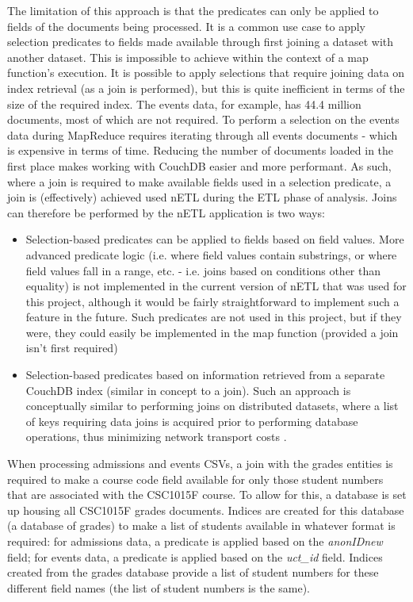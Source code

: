 The limitation of this approach is that the predicates can only be applied to fields of the documents being processed. It is a common use case to apply selection predicates to fields made available through first joining a dataset with another dataset. This is impossible to achieve within the context of a map function’s execution. It is possible to apply selections that require joining data on index retrieval (as a join is performed), but this is quite inefficient in terms of the size of the required index. The events data, for example, has 44.4 million documents, most of which are not required. To perform a selection on the events data during MapReduce requires iterating through all events documents - which is expensive in terms of time. Reducing the number of documents loaded in the first place makes working with CouchDB easier and more performant. As such, where a join is required to make available fields used in a selection predicate, a join is (effectively) achieved used nETL during the ETL phase of analysis. Joins can therefore be performed by the nETL application is two ways:

\begin{itemize}
    \item Selection-based predicates can be applied to fields based on field values. More advanced predicate logic (i.e. where field values contain substrings, or where field values fall in a range, etc. - i.e. joins based on conditions other than equality) is not implemented in the current version of nETL that was used for this project, although it would be fairly straightforward to implement such a feature in the future. Such predicates are not used in this project, but if they were, they could easily be implemented in the map function (provided a join isn't first required)
    \item Selection-based predicates based on information retrieved from a separate CouchDB index (similar in concept to a join). Such an approach is conceptually similar to performing joins on distributed datasets, where a list of keys requiring data joins is acquired prior to performing database operations, thus minimizing network transport costs \cite{sonia2018}.
\end{itemize}

When processing admissions and events CSVs, a join with the grades entities is required to make a course code field available for only those student numbers that are associated with the CSC1015F course. To allow for this, a database is set up housing all CSC1015F grades documents. Indices are created for this database (a database of grades) to make a list of students available in whatever format is required: for admissions data, a predicate is applied based on the \textit{anonIDnew} field; for events data, a predicate is applied based on the \textit{uct\_id} field. Indices created from the grades database provide a list of student numbers for these different field names (the list of student numbers is the same).

